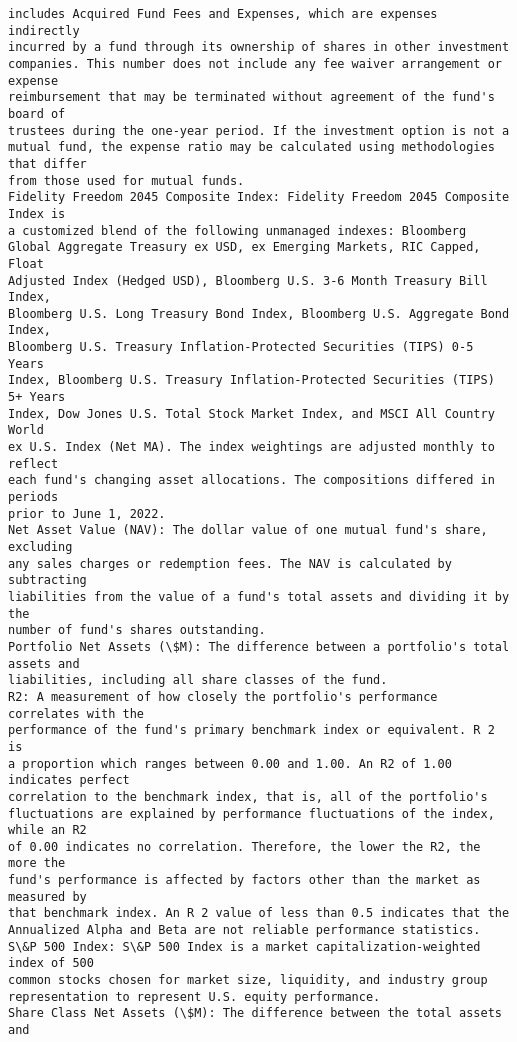 \documentclass[11pt]{article}
\begin{document}
\begin{Verbatim}[commandchars=\\\{\}]
includes Acquired Fund Fees and Expenses, which are expenses indirectly
incurred by a fund through its ownership of shares in other investment
companies. This number does not include any fee waiver arrangement or expense
reimbursement that may be terminated without agreement of the fund's board of
trustees during the one-year period. If the investment option is not a
mutual fund, the expense ratio may be calculated using methodologies that differ
from those used for mutual funds.
Fidelity Freedom 2045 Composite Index: Fidelity Freedom 2045 Composite Index is
a customized blend of the following unmanaged indexes: Bloomberg
Global Aggregate Treasury ex USD, ex Emerging Markets, RIC Capped, Float
Adjusted Index (Hedged USD), Bloomberg U.S. 3-6 Month Treasury Bill Index,
Bloomberg U.S. Long Treasury Bond Index, Bloomberg U.S. Aggregate Bond Index,
Bloomberg U.S. Treasury Inflation-Protected Securities (TIPS) 0-5 Years
Index, Bloomberg U.S. Treasury Inflation-Protected Securities (TIPS) 5+ Years
Index, Dow Jones U.S. Total Stock Market Index, and MSCI All Country World
ex U.S. Index (Net MA). The index weightings are adjusted monthly to reflect
each fund's changing asset allocations. The compositions differed in periods
prior to June 1, 2022.
Net Asset Value (NAV): The dollar value of one mutual fund's share, excluding
any sales charges or redemption fees. The NAV is calculated by subtracting
liabilities from the value of a fund's total assets and dividing it by the
number of fund's shares outstanding.
Portfolio Net Assets (\$M): The difference between a portfolio's total assets and
liabilities, including all share classes of the fund.
R2: A measurement of how closely the portfolio's performance correlates with the
performance of the fund's primary benchmark index or equivalent. R 2 is
a proportion which ranges between 0.00 and 1.00. An R2 of 1.00 indicates perfect
correlation to the benchmark index, that is, all of the portfolio's
fluctuations are explained by performance fluctuations of the index, while an R2
of 0.00 indicates no correlation. Therefore, the lower the R2, the more the
fund's performance is affected by factors other than the market as measured by
that benchmark index. An R 2 value of less than 0.5 indicates that the
Annualized Alpha and Beta are not reliable performance statistics.
S\&P 500 Index: S\&P 500 Index is a market capitalization-weighted index of 500
common stocks chosen for market size, liquidity, and industry group
representation to represent U.S. equity performance.
Share Class Net Assets (\$M): The difference between the total assets and

\end{Verbatim}
\end{document}

